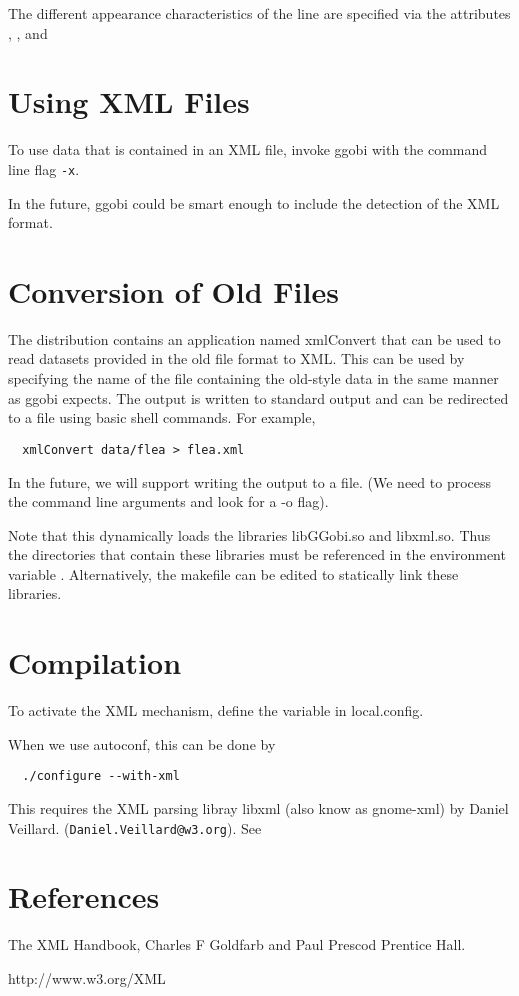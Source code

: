 \documentclass{article}
\def\XMLAttribute#1{\Escape{#1}}
\begin{document}
The different appearance characteristics of the line
are specified via
the attributes
\XMLAttribute{width}, 
\XMLAttribute{color},
\XMLAttribute{type}
and
\XMLAttribute{hidden}






\section{Using XML Files}
To use data that is contained in an XML file, invoke ggobi with the
command line flag \texttt{-x}.

In the future, ggobi could be smart enough to include the detection of
the XML format.



\section{Conversion of Old Files}
The distribution contains an application named xmlConvert that can be
used to read datasets provided in the old file format to XML.  This
can be used by specifying the name of the file containing the
old-style data in the same manner as ggobi expects.
The output is written to standard output
and can be redirected to a file using basic shell commands.
For example,
\begin{verbatim}
  xmlConvert data/flea > flea.xml
\end{verbatim}
In the future, we will support writing the output to a file. (We need
to process the command line arguments and look for a -o flag).


Note that this dynamically loads the libraries libGGobi.so and
libxml.so.  Thus the directories that contain these libraries must be
referenced in the environment variable 
.
Alternatively, the makefile can be edited to statically link these
libraries.


\section{Compilation}
To activate the XML mechanism, define the variable
 in  local.config.

When we use autoconf, this can be done by
\begin{verbatim}
  ./configure --with-xml
\end{verbatim}

This requires the XML parsing libray libxml (also know as gnome-xml) by Daniel Veillard.
(\texttt{Daniel.Veillard@w3.org}).
See 
\section{References}
The XML Handbook, Charles F Goldfarb and Paul Prescod
 Prentice Hall.

http://www.w3.org/XML
\end{document}
